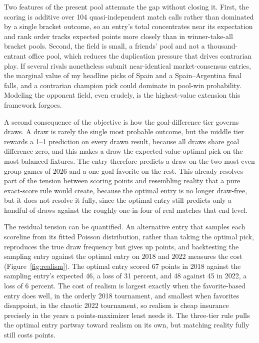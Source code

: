 \documentclass[11pt,a4paper]{article}
\begin{document}
Two features of the present pool attenuate the gap without closing it. First, the scoring is additive over 104 quasi-independent match calls rather than dominated by a single bracket outcome, so an entry's total concentrates near its expectation and rank order tracks expected points more closely than in winner-take-all bracket pools. Second, the field is small, a friends' pool and not a thousand-entrant office pool, which reduces the duplication pressure that drives contrarian play. If several rivals nonetheless submit near-identical market-consensus entries, the marginal value of my headline picks of Spain and a Spain--Argentina final falls, and a contrarian champion pick could dominate in pool-win probability. Modeling the opponent field, even crudely, is the highest-value extension this framework forgoes.

A second consequence of the objective is how the goal-difference tier governs draws. A draw is rarely the single most probable outcome, but the middle tier rewards a 1--1 prediction on every drawn result, because all draws share goal difference zero, and this makes a draw the expected-value-optimal pick on the most balanced fixtures. The entry therefore predicts a draw on the two most even group games of 2026 and a one-goal favorite on the rest. This already resolves part of the tension between scoring points and resembling reality that a pure exact-score rule would create, because the optimal entry is no longer draw-free, but it does not resolve it fully, since the optimal entry still predicts only a handful of draws against the roughly one-in-four of real matches that end level.

The residual tension can be quantified. An alternative entry that samples each scoreline from its fitted Poisson distribution, rather than taking the optimal pick, reproduces the true draw frequency but gives up points, and backtesting the sampling entry against the optimal entry on 2018 and 2022 measures the cost (Figure~\ref{fig:realism}). The optimal entry scored 67 points in 2018 against the sampling entry's expected 46, a loss of 31 percent, and 48 against 45 in 2022, a loss of 6 percent. The cost of realism is largest exactly when the favorite-based entry does well, in the orderly 2018 tournament, and smallest when favorites disappoint, in the chaotic 2022 tournament, so realism is cheap insurance precisely in the years a points-maximizer least needs it. The three-tier rule pulls the optimal entry partway toward realism on its own, but matching reality fully still costs points.
\end{document}
